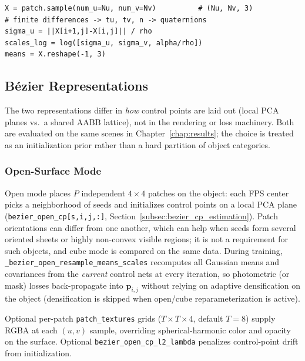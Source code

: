 \documentclass{report}
\newcommand{\filepath}[1]{\nolinkurl{#1}}
\newcommand{\code}[1]{\nolinkurl{#1}}
\begin{document}
\begin{lstlisting}[caption={Open-mode sampling and Gaussian frames (\filepath{splatfacto.py}, simplified).},label={lst:bezier_sample}]
X = patch.sample(num_u=Nu, num_v=Nv)          # (Nu, Nv, 3)
# finite differences -> tu, tv, n -> quaternions
sigma_u = ||X[i+1,j]-X[i,j]|| / rho
scales_log = log([sigma_u, sigma_v, alpha/rho])
means = X.reshape(-1, 3)
\end{lstlisting}

\subsection{B\'ezier Representations}
\label{subsec:bezier_representations}

The two representations differ in \emph{how} control points are laid out (local PCA planes vs.\ a shared AABB lattice), not in the rendering or loss machinery. Both are evaluated on the same scenes in Chapter~\ref{chap:results}; the choice is treated as an initialization prior rather than a hard partition of object categories.

\subsubsection{Open-Surface Mode}
\label{subsec:bezier_open}

Open mode places $P$ independent $4\times 4$ patches on the object: each FPS center picks a neighborhood of seeds and initializes control points on a local PCA plane (\code{bezier\_open\_cp[s,i,j,:]}, Section~\ref{subsec:bezier_cp_estimation}). Patch orientations can differ from one another, which can help when seeds form several oriented sheets or highly non-convex visible regions; it is not a requirement for such objects, and cube mode is compared on the same data. During training, \code{\_bezier\_open\_resample\_means\_scales} recomputes all Gaussian means and covariances from the \emph{current} control nets at every iteration, so photometric (or mask) losses back-propagate into $\mathbf{p}_{i,j}$ without relying on adaptive densification on the object (densification is skipped when open/cube reparameterization is active).

Optional per-patch \code{patch\_textures} grids ($T\times T\times 4$, default $T=8$) supply RGBA at each $(u,v)$ sample, overriding spherical-harmonic color and opacity on the surface. Optional \code{bezier\_open\_cp\_l2\_lambda} penalizes control-point drift from initialization.
\end{document}
